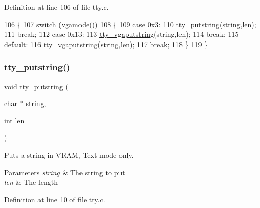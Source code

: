 Definition at line 106 of file tty.\+c.


\begin{DoxyCode}
106                                             \{
107     \textcolor{keywordflow}{switch} (\hyperlink{a00041_af6d170c9401ea8f94d4c5cf09347cca7_af6d170c9401ea8f94d4c5cf09347cca7}{vgamode}())
108     \{
109     \textcolor{keywordflow}{case} 0x3:
110         \hyperlink{a00140_a5b5bf610a57f3c59b2851fa2652081ec_a5b5bf610a57f3c59b2851fa2652081ec}{tty\_putstring}(\textcolor{keywordtype}{string},len);
111         \textcolor{keywordflow}{break};
112     \textcolor{keywordflow}{case} 0x13:
113         \hyperlink{a00140_a05ca3f5e64f38fec173b635ca8465415_a05ca3f5e64f38fec173b635ca8465415}{tty\_vgaputstring}(\textcolor{keywordtype}{string},len);
114         \textcolor{keywordflow}{break};
115     \textcolor{keywordflow}{default}:
116         \hyperlink{a00140_a05ca3f5e64f38fec173b635ca8465415_a05ca3f5e64f38fec173b635ca8465415}{tty\_vgaputstring}(\textcolor{keywordtype}{string},len);
117         \textcolor{keywordflow}{break};
118     \}
119 \}
\end{DoxyCode}
\mbox{\label{a00140_a5b5bf610a57f3c59b2851fa2652081ec_a5b5bf610a57f3c59b2851fa2652081ec}} 
\subsubsection{\texorpdfstring{tty\+\_\+putstring()}{tty\_putstring()}}
{\footnotesize\ttfamily void tty\+\_\+putstring (\begin{DoxyParamCaption}\item[{char $\ast$}]{string,  }\item[{int}]{len }\end{DoxyParamCaption})}



Puts a string in V\+R\+AM, Text mode only. 


\begin{DoxyParams}{Parameters}
{\em string} & The string to put \\
\hline
{\em len} & The length \\
\hline
\end{DoxyParams}


Definition at line 10 of file tty.\+c.


